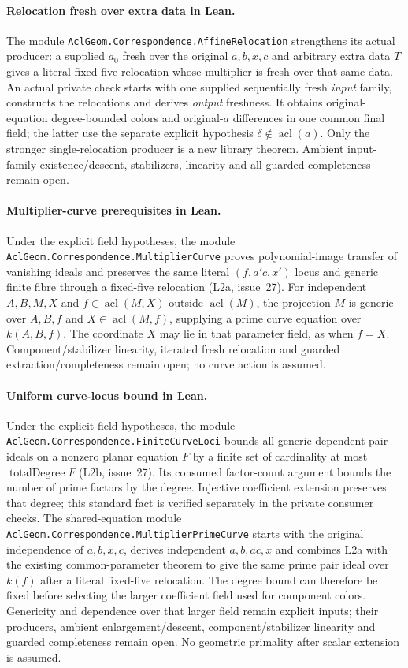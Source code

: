 \documentclass[11pt,oneside]{article}
\theoremstyle{definition}
\theoremstyle{remark}
\newcommand{\acl}{\operatorname{acl}}
\newcommand{\lean}[1]{\nolinkurl{#1}}
\begin{document}
\paragraph{Relocation fresh over extra data in Lean.}
The module \lean{AclGeom.Correspondence.AffineRelocation} strengthens
its actual producer: a supplied $a_0$ fresh over the original
$a,b,x,c$ and arbitrary extra data $T$ gives a literal fixed-five
relocation whose multiplier is fresh over that same data.
An actual private check starts with one supplied sequentially fresh
\emph{input} family, constructs the relocations and derives
\emph{output} freshness. It obtains original-equation degree-bounded
colors and original-$a$ differences in one common final field;
the latter use the separate explicit hypothesis $\delta\notin\acl(a)$.
Only the stronger single-relocation producer is a new library theorem.
Ambient input-family existence/descent, stabilizers, linearity and all
guarded completeness remain open.

\paragraph{Multiplier-curve prerequisites in Lean.}
Under the explicit field hypotheses, the module
\lean{AclGeom.Correspondence.MultiplierCurve} proves polynomial-image
transfer of vanishing ideals and preserves the same literal $(f,a'c,x')$ locus
and generic finite fibre through a fixed-five relocation (L2a, issue~27).
For independent $A,B,M,X$ and $f\in\operatorname{acl}(M,X)$ outside
$\operatorname{acl}(M)$, the projection $M$ is generic over $A,B,f$ and
$X\in\operatorname{acl}(M,f)$, supplying a prime curve equation over $k(A,B,f)$.
The coordinate $X$ may lie in that parameter field, as when $f=X$.
Component/stabilizer linearity, iterated fresh relocation and guarded
extraction/completeness remain open; no curve action is assumed.

\paragraph{Uniform curve-locus bound in Lean.}
Under the explicit field hypotheses, the module
\lean{AclGeom.Correspondence.FiniteCurveLoci} bounds all generic
dependent pair ideals on a nonzero planar equation $F$ by a finite set
of cardinality at most $\operatorname{totalDegree}F$ (L2b, issue~27).
Its consumed factor-count argument bounds the number of prime factors
by the degree. Injective coefficient extension preserves that degree;
this standard fact is verified separately in the private consumer checks.
The shared-equation module
\lean{AclGeom.Correspondence.MultiplierPrimeCurve} starts with the
original independence of $a,b,x,c$, derives independent $a,b,ac,x$ and
combines L2a with the existing common-parameter theorem to give the same
prime pair ideal over $k(f)$ after a literal fixed-five relocation.
The degree bound can therefore be fixed before selecting the larger
coefficient field used for component colors.
Genericity and dependence over that larger field remain explicit inputs;
their producers, ambient enlargement/descent, component/stabilizer
linearity and guarded completeness remain open.
No geometric primality after scalar extension is assumed.
\end{document}
